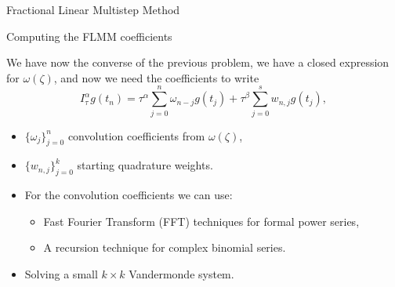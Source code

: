 \documentclass[aspectratio=169,xcolor=dvipsnames]{beamer}
\begin{document}
\begin{frame}{Fractional Linear Multistep Method}

\end{frame}

\begin{frame}{Computing the FLMM coefficients}

We have now the converse of the previous problem, we have a closed expression for $\omega(\zeta)$, and now we need the coefficients to write
\[
I_\tau^\alpha g(t_n) = \tau^\alpha \sum_{j=0}^{n} \omega_{n-j} g(t_j) + \tau^\beta \sum_{j=0}^{s} w_{n,j} g(t_j),
\]
\begin{itemize}
	\item $\{\omega_{j}\}_{j=0}^n$ convolution coefficients from $\omega(\zeta)$,
	\item $\{w_{n,j}\}_{j=0}^{k}$ starting quadrature weights. 
\end{itemize}

\begin{itemize}
	\item<2-> For the convolution coefficients we can use:
	\begin{itemize}
		\item<3->[\faDoorClosed] Fast Fourier Transform (FFT) techniques for formal power series,
		\item<4->[\faDoorClosed] A recursion technique for complex binomial series. 
	\end{itemize}
	\item<5-> Solving a small $k \times k$ Vandermonde system. 
\end{itemize}

\end{frame}
\end{document}
